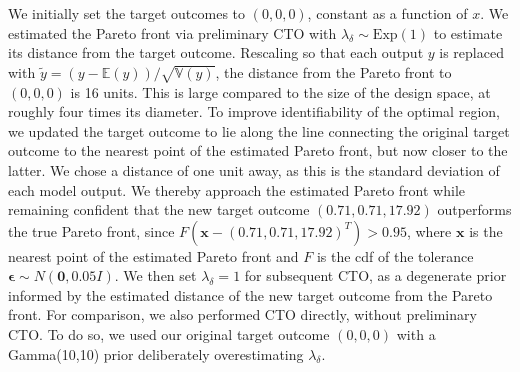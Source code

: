 \documentclass[12pt]{article}
\begin{document}
We initially set the target outcomes to $(0,0,0)$, constant as a function of $x$. 
%
We estimated the Pareto front via preliminary CTO with $\lambda_\delta\sim \mathrm{Exp}(1)$ to estimate its distance from the target outcome.
%
%
Rescaling so that each output $y$ is replaced with $\tilde y=(y-\mathbb E(y))/\sqrt{\mathbb V(y)}$, the distance from the Pareto front to $(0,0,0)$ is 16 units.
%
This is large compared to the size of the design space, at roughly four times its diameter.
%
%
%
To improve identifiability of the optimal region, we updated the target outcome to lie along the line connecting the original target outcome to the nearest point of the estimated Pareto front, but now closer to the latter.
%
We chose a distance of one unit away, as this is the standard deviation of each model output.
%
We thereby approach the estimated Pareto front while remaining confident that the new target outcome $(0.71, 0.71, 17.92)$ outperforms the true Pareto front, 
%
since $F(\mathbf x-(0.71,0.71,17.92)^T)>0.95$, where $\mathbf x$ is the nearest point of the estimated Pareto front and $F$ is the cdf of the tolerance $\boldsymbol\epsilon\sim N(\mathbf 0, 0.05I)$.
%
We then set $\lambda_\delta=1$ for subsequent CTO, as a degenerate prior informed by the estimated distance of the new target outcome from the Pareto front.
%
%
For comparison, we also performed CTO directly, without preliminary CTO.
%
To do so, we used our original target outcome $(0,0,0)$ with a Gamma(10,10) prior deliberately overestimating $\lambda_\delta$.
%
%
\end{document}
